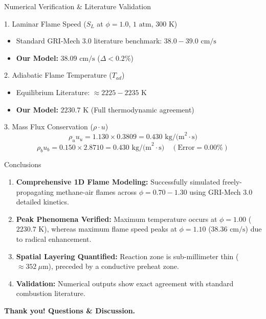 \documentclass[aspectratio=169, 10pt]{beamer}
\begin{document}
\begin{frame}{Numerical Verification \& Literature Validation}
\begin{block}{1. Laminar Flame Speed ($S_L$ at $\phi = 1.0$, $1\text{ atm}$, $300\text{ K}$)}
\begin{itemize}
  \item Standard GRI-Mech 3.0 literature benchmark: $38.0 - 39.0\text{ cm/s}$
  \item \textbf{Our Model:} \textbf{$38.09\text{ cm/s}$} ($\Delta < 0.2\%$)
\end{itemize}
\end{block}

\begin{block}{2. Adiabatic Flame Temperature ($T_{ad}$)}
\begin{itemize}
  \item Equilibrium Literature: $\approx 2225 - 2235\text{ K}$
  \item \textbf{Our Model:} \textbf{$2230.7\text{ K}$} (Full thermodynamic agreement)
\end{itemize}
\end{block}

\begin{block}{3. Mass Flux Conservation ($\rho \cdot u$)}
$$\rho_u u_u = 1.130 \times 0.3809 = 0.430\text{ kg/(m}^2\cdot\text{s})$$
$$\rho_b u_b = 0.150 \times 2.8710 = 0.430\text{ kg/(m}^2\cdot\text{s}) \quad (\text{Error} = 0.00\%)$$
\end{block}
\end{frame}

\begin{frame}{Conclusions}
\begin{enumerate}
  \item \textbf{Comprehensive 1D Flame Modeling:} Successfully simulated freely-propagating methane-air flames across $\phi = 0.70 - 1.30$ using GRI-Mech 3.0 detailed kinetics.
  \item \textbf{Peak Phenomena Verified:} Maximum temperature occurs at $\phi = 1.00$ ($2230.7\text{ K}$), whereas maximum flame speed peaks at $\phi = 1.10$ ($38.36\text{ cm/s}$) due to radical enhancement.
  \item \textbf{Spatial Layering Quantified:} Reaction zone is sub-millimeter thin ($\approx 352\ \mu\text{m}$), preceded by a conductive preheat zone.
  \item \textbf{Validation:} Numerical outputs show exact agreement with standard combustion literature.
\end{enumerate}

\vspace{1em}
\centering
\textbf{Thank you! Questions \& Discussion.}
\end{frame}
\end{document}
